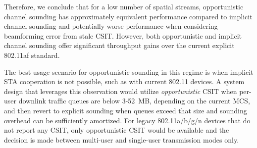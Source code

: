


	Therefore, we conclude that for a low number of spatial streams, opportunistic channel sounding has approximately equivalent performance compared to implicit channel sounding and potentially worse performance when considering beamforming error from stale \ac{CSIT}.
	However, both opportunistic and implicit channel sounding offer significant throughput gains over the current explicit 802.11af standard.
	
	The best usage scenario for opportunistic sounding in this regime is when implicit \ac{STA} cooperation is not possible, such as with current 802.11 devices.
	A system design that leverages this observation would utilize \textit{opportunistic} \ac{CSIT} when per-user downlink traffic queues are below 3-52~MB, depending on the current \ac{MCS}, and then revert to explicit sounding when queues exceed that size and sounding overhead can be sufficiently amortized.
	For legacy 802.11a/b/g/n devices that do not report any CSIT, only opportunistic \ac{CSIT} would be available and the decision is made between multi-user and single-user transmission modes only.



